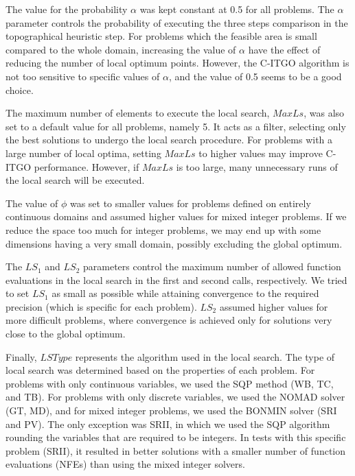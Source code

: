 The value for the probability $\alpha$ was kept constant at 0.5 for all problems. The $\alpha$ parameter controls the probability of executing the three steps comparison in the topographical heuristic step. For problems which the feasible area is small compared to the whole domain, increasing the value of $\alpha$ have the effect of reducing the number of local optimum points. However, the C-ITGO algorithm is not too sensitive to specific values of $\alpha$, and the value of 0.5 seems to be a good choice.

The maximum number of elements to execute the local search, $MaxLs$, was also set to a default value for all problems, namely 5. It acts as a filter, selecting only the best solutions to undergo the local search procedure. For problems with a large number of local optima, setting $MaxLs$ to higher values may improve C-ITGO performance. However, if $MaxLs$ is too large, many unnecessary runs of the local search will be executed.


The value of $\phi$ was set to smaller values for problems defined on entirely continuous domains and assumed higher values for mixed integer problems. If we reduce the space too much for integer problems, we may end up with some dimensions having a very small domain, possibly excluding the global optimum.

The $LS_1$ and $LS_2$ parameters control the maximum number of allowed function evaluations in the local search in the first and second calls, respectively. We tried to set $LS_1$ as small as possible while attaining convergence to the required precision (which is specific for each problem). $LS_2$ assumed higher values for more difficult problems, where convergence is achieved only for solutions very close to the global optimum.

Finally, $LSType$ represents the algorithm used in the local search. The type of local search was determined based on the properties of each problem. For problems with only continuous variables, we used the SQP method (WB, TC, and TB). For problems with only discrete variables, we used the NOMAD solver (GT, MD), and for mixed integer problems, we used the BONMIN solver (SRI and PV). The only exception was SRII, in which we used the SQP algorithm rounding the variables that are required to be integers. In tests with this specific problem (SRII), it resulted in better solutions with a smaller number of function evaluations (NFEs) than using the mixed integer solvers.